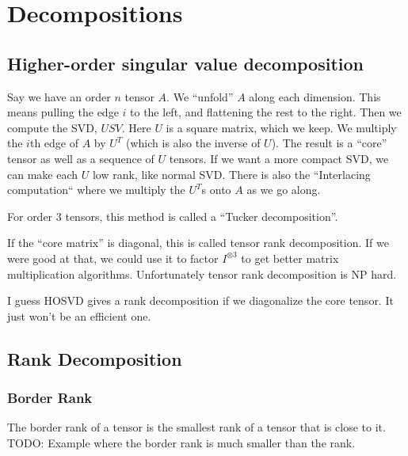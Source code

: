 
\chapter{Decompositions}


\section{Higher-order singular value decomposition}
\label{sec:HOSVD}
Say we have an order $n$ tensor $A$.
We ``unfold'' $A$ along each dimension.
This means pulling the edge $i$ to the left, and flattening the rest to the right.
Then we compute the SVD, $USV$.
Here $U$ is a square matrix, which we keep.
We multiply the $i$th edge of $A$ by $U^T$ (which is also the inverse of $U$).
The result is a ``core'' tensor as well as a sequence of $U$ tensors.
If we want a more compact SVD, we can make each $U$ low rank, like normal SVD.
There is also the ``Interlacing computation`` where we multiply the $U^T$s onto $A$ as we go along.

For order $3$ tensors, this method is called a ``Tucker decomposition''.

If the ``core matrix'' is diagonal, this is called tensor rank decomposition.
If we were good at that, we could use it to factor $I^{\otimes 3}$ to get better matrix multiplication algorithms.
Unfortunately tensor rank decomposition is NP hard.

I guess HOSVD gives a rank decomposition if we diagonalize the core tensor.
It just won't be an efficient one.

\section{Rank Decomposition}

\subsection{Border Rank}
The border rank of a tensor is the smallest rank of a tensor that is close to it.
TODO: Example where the border rank is much smaller than the rank.

